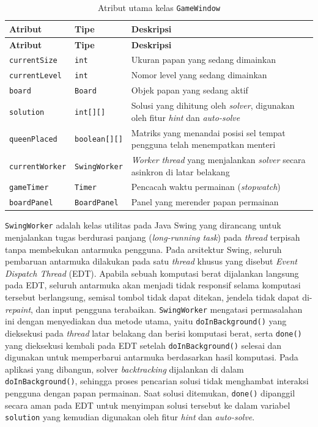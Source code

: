 \begin{longtable}{llp{5.5cm}}
	\caption{Atribut utama kelas \texttt{GameWindow}}
	\label{tab:attr-gamewindow} \\
	\toprule
	\textbf{Atribut} & \textbf{Tipe} & \textbf{Deskripsi} \\
	\midrule
	\endfirsthead
	\toprule
	\textbf{Atribut} & \textbf{Tipe} & \textbf{Deskripsi} \\
	\midrule
	\endhead
	\bottomrule
	\endfoot
	\texttt{currentSize} & \texttt{int} & Ukuran papan yang sedang dimainkan \\
	\midrule
	\texttt{currentLevel} & \texttt{int} & Nomor level yang sedang dimainkan \\
	\midrule
	\texttt{board} & \texttt{Board} & Objek papan yang sedang aktif \\
	\midrule
	\texttt{solution} & \texttt{int[][]} & Solusi yang dihitung oleh \textit{solver}, digunakan oleh fitur \textit{hint} dan \textit{auto-solve} \\
	\midrule
	\texttt{queenPlaced} & \texttt{boolean[][]} & Matriks yang menandai posisi sel tempat pengguna telah menempatkan menteri \\
	\midrule
	\texttt{currentWorker} & \texttt{SwingWorker} & \textit{Worker thread} yang menjalankan \textit{solver} secara asinkron di latar belakang \\
	\midrule
	\texttt{gameTimer} & \texttt{Timer} & Pencacah waktu permainan (\textit{stopwatch}) \\
	\midrule
	\texttt{boardPanel} & \texttt{BoardPanel} & Panel yang merender papan permainan \\
	\bottomrule
\end{longtable}

\texttt{SwingWorker} adalah kelas utilitas pada Java Swing yang dirancang untuk menjalankan tugas berdurasi panjang (\textit{long-running task}) pada \textit{thread} terpisah tanpa membekukan antarmuka pengguna. Pada arsitektur Swing, seluruh pembaruan antarmuka dilakukan pada satu \textit{thread} khusus yang disebut \textit{Event Dispatch Thread} (EDT). Apabila sebuah komputasi berat dijalankan langsung pada EDT, seluruh antarmuka akan menjadi tidak responsif selama komputasi tersebut berlangsung, semisal tombol tidak dapat ditekan, jendela tidak dapat di-\textit{repaint}, dan input pengguna terabaikan. \texttt{SwingWorker} mengatasi permasalahan ini dengan menyediakan dua metode utama, yaitu \texttt{doInBackground()} yang dieksekusi pada \textit{thread} latar belakang dan berisi komputasi berat, serta \texttt{done()} yang dieksekusi kembali pada EDT setelah \texttt{doInBackground()} selesai dan digunakan untuk memperbarui antarmuka berdasarkan hasil komputasi. Pada aplikasi yang dibangun, solver \textit{backtracking} dijalankan di dalam \texttt{doInBackground()}, sehingga proses pencarian solusi tidak menghambat interaksi pengguna dengan papan permainan. Saat solusi ditemukan, \texttt{done()} dipanggil secara aman pada EDT untuk menyimpan solusi tersebut ke dalam variabel \texttt{solution} yang kemudian digunakan oleh fitur \textit{hint} dan \textit{auto-solve}.

